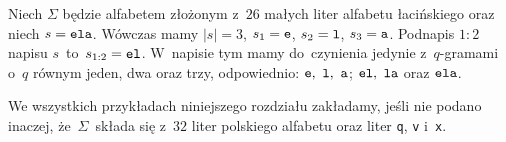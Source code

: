 \documentclass{praca1}
\begin{document}


\begin{example}
Niech $\Sigma$ będzie alfabetem złożonym z~$26$ małych liter alfabetu łacińskiego oraz niech $s = \verb|ela|$. Wówczas mamy $|s| = 3$, $s_1 = \verb|e|$, $s_2 = \verb|l|$, $s_3 = \verb|a|$. Podnapis $1\!\!:\!\!2$ napisu $s$~to~$s_{1:2} = \verb|el|$. W~napisie tym mamy do~czynienia jedynie z~$q$-gramami o~$q$ równym jeden, dwa oraz trzy, odpowiednio: $\verb|e|,\ \verb|l|,\ \verb|a|$; $\verb|el|,\ \verb|la|$ oraz $\verb|ela|$.
\end{example}


We wszystkich przykładach niniejszego rozdziału zakładamy, jeśli nie podano inaczej, że~$\Sigma$~składa się z~$32$ liter polskiego alfabetu oraz liter \verb|q|, \verb|v| i~\verb|x|.


\end{document}
